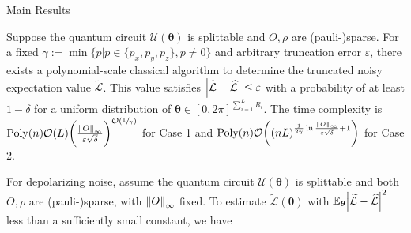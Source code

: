 \documentclass[10pt]{beamer}
\begin{document}
\begin{CJK}{UTF8}{gbsn}
\begin{frame}[fragile]{Main Results}
\begin{mdframed}
\begin{theorem}\label{thm:main}
 Suppose the quantum circuit $\mathcal{U}(\bm{\theta})$ is splittable and $O,\rho$ are (pauli-)sparse. For a fixed $\gamma:=\min\{p|{p \in \{p_x,p_y,p_z\},p\neq 0}\}$ and arbitrary truncation error $\varepsilon$, there exists a polynomial-scale classical algorithm to determine the truncated noisy expectation value $\widetilde{\mathcal{L}}$. This value satisfies $\abs{\widetilde{\mathcal{L}}-\widehat{\mathcal{L}}} \leq \varepsilon$ with a probability of at least $1-\delta$ for a uniform distribution of $\bm{\theta}\in [0,2\pi]^{\sum_{i=1}^{L}R_i}$. The time complexity is $\mathrm{Poly}(n) \order{L} \bigg(\frac{\norm{O}_\infty}{\varepsilon \sqrt{\delta}} \bigg)^{\order{\sfrac{1}{\gamma}}}$ for Case 1 and $\mathrm{Poly}(n)  \order{(nL)^{\frac{1}{2\gamma} \ln{\frac{\norm{O}_\infty}{\varepsilon \sqrt{\delta}}}+1}}$ for Case 2.
\end{theorem}
\end{mdframed}
\vspace{2em}
\end{frame}



\begin{frame}
  \begin{mdframed}
  \begin{corollary}
    \label{prop:lambda_and_L}
 For depolarizing noise, assume the quantum circuit $\mathcal{U}(\bm{\theta})$ is splittable and both $O,\rho$ are (pauli-)sparse, with $\norm{O}_\infty$ fixed.
 To estimate $\widetilde{\mathcal{L}}(\bm{\theta})$ with $\mathbb{E}_{\bm{\theta}}\abs{\widetilde{\mathcal{L}}-\widehat{\mathcal{L}}}^2$ less than a sufficiently small constant,
 we have 
      

\end{corollary}
\end{mdframed}
\end{frame}
\end{CJK}
\end{document}
